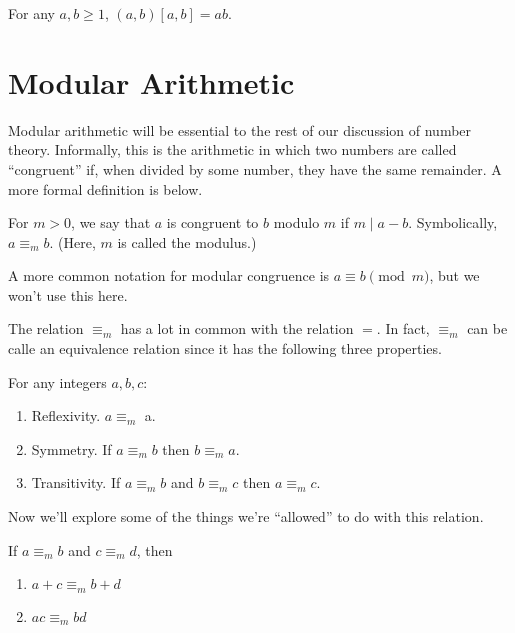 \documentclass[../m55main.tex]{subfiles}
\begin{document}
\begin{theorem}
    For any $a,b \geq 1$, $(a,b) [a,b] = ab$.
\end{theorem}


\section{Modular Arithmetic}
Modular arithmetic will be essential to the rest of our discussion of number theory.
Informally, this is the arithmetic in which two numbers are called ``congruent'' if, when divided by some number, they have the same remainder.
A more formal definition is below.

\begin{definition}
    For $m > 0$, we say that $a$ is congruent to $b$ modulo $m$ if $m \mid a - b$.
    Symbolically, $a \equiv_m b$.
    (Here, $m$ is called the modulus.)
\end{definition}

A more common notation for modular congruence is $a \equiv b \pmod m$, but we won't use this here.

The relation $\equiv_m$ has a lot in common with the relation $=$.
In fact, $\equiv_m$ can be calle an equivalence relation since it has the following three properties.

\begin{theorem}
    For any integers $a, b, c$:
    \begin{enumerate}[label=(\alph*)]
        \item Reflexivity. $a \equiv_m$ a.
        \item Symmetry. If $a \equiv_m b$ then $b \equiv_m a$.
        \item Transitivity. If $a \equiv_m b$ and $b \equiv_m c$ then $a \equiv_m c$.
    \end{enumerate}
\end{theorem}


Now we'll explore some of the things we're ``allowed'' to do with this relation.

\begin{theorem}
    If $a \equiv_m b$ and $c \equiv_m d$, then
    \begin{enumerate}[label=(\alph*)]
        \item $a + c \equiv_m b + d$
        \item $ac \equiv_m bd$
    \end{enumerate}
\end{theorem}
\end{document}
